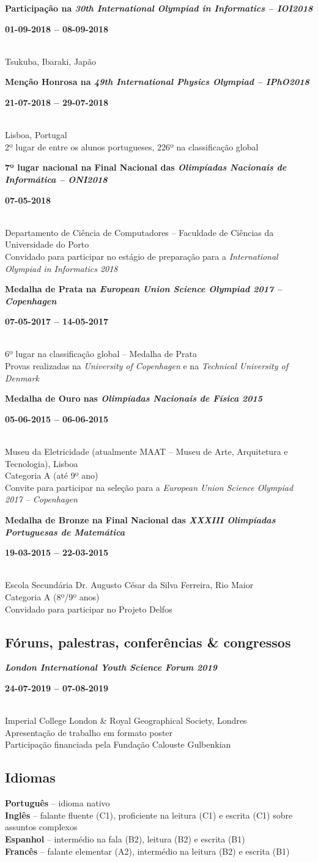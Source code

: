 \documentclass[8pt]{extarticle}
\newcommand{\parag}[1]{
\begin{minipage}{\textwidth} \hfill
\begin{minipage}{\dimexpr\textwidth-0.6cm}
	#1
\end{minipage}
\end{minipage}
}
\newcommand{\itemtime}[2]{
#1 \hfill \begin{minipage}[t]{0.185\textwidth}         #2  \end{minipage}
}
\newcommand{\job}[3]{\parag{
\itemtime{\textbf{#1}}{\textbf{#2}}\\
#3 \vspace*{9px}}}
\newcommand{\idiom}[2]{\textbf{#1} – #2\vspace*{6px}\\}
\begin{document}
\job{Participação na \textit{30th International Olympiad in Informatics – IOI2018}}{01-09-2018 – 08-09-2018}{
Tsukuba, Ibaraki, Japão
}
\job{Menção Honrosa na \textit{49th International Physics Olympiad – IPhO2018}}{21-07-2018 – 29-07-2018}{
Lisboa, Portugal\\
2º lugar de entre os alunos portugueses, 226º na classificação global
}
\job{7º lugar nacional na Final Nacional das \textit{Olimpíadas Nacionais de Informática – ONI2018}}{07-05-2018}{
Departamento de Ciência de Computadores – Faculdade de Ciências da Universidade do Porto\\
Convidado para participar no estágio de preparação para a \textit{International Olympiad in Informatics 2018}
}
\job{Medalha de Prata na \textit{European Union Science Olympiad 2017 – Copenhagen}}{07-05-2017 – 14-05-2017}{
6º lugar na classificação global – Medalha de Prata\\
Provas realizadas na \textit{University of Copenhagen} e na \textit{Technical University of Denmark}
}
\job{Medalha de Ouro nas \textit{Olimpíadas Nacionais de Física 2015}}{05-06-2015 – 06-06-2015}{
Museu da Eletricidade (atualmente MAAT – Museu de Arte, Arquitetura e Tecnologia), Lisboa\\
Categoria A (até 9º ano)\\
Convite para participar na seleção para a \textit{European Union Science Olympiad 2017 – Copenhagen}
}
\job{Medalha de Bronze na Final Nacional das \textit{XXXIII Olimpíadas Portuguesas de Matemática}}{19-03-2015 – 22-03-2015}{
Escola Secundária Dr. Augusto César da Silva Ferreira, Rio Maior\\
Categoria A (8º/9º anos)\\
Convidado para participar no Projeto Delfos
}
\subsection*{Fóruns, palestras, conferências \& congressos}
\job{\textit{London International Youth Science Forum 2019}}{24-07-2019 – 07-08-2019}{
Imperial College London \& Royal Geographical Society, Londres\\
Apresentação de trabalho em formato poster\\
Participação financiada pela Fundação Calouste Gulbenkian
}
\subsection*{Idiomas}
\parag{
\idiom{Português}{idioma nativo}
\idiom{Inglês}{falante fluente (C1), proficiente na leitura (C1) e escrita (C1) sobre assuntos complexos}
\idiom{Espanhol}{intermédio na fala (B2), leitura (B2) e escrita (B1)}
\idiom{Francês}{falante elementar (A2), intermédio na leitura (B2) e escrita (B1)}
}
\end{document}

